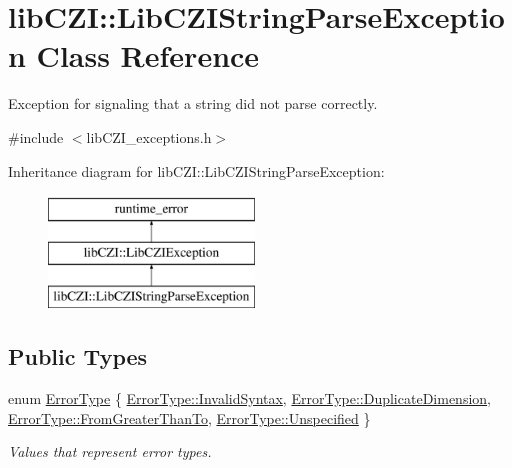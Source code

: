\hypertarget{classlib_c_z_i_1_1_lib_c_z_i_string_parse_exception}{}\section{lib\+C\+ZI\+:\+:Lib\+C\+Z\+I\+String\+Parse\+Exception Class Reference}
\label{classlib_c_z_i_1_1_lib_c_z_i_string_parse_exception}


Exception for signaling that a string did not parse correctly.  




{\ttfamily \#include $<$lib\+C\+Z\+I\+\_\+exceptions.\+h$>$}

Inheritance diagram for lib\+C\+ZI\+:\+:Lib\+C\+Z\+I\+String\+Parse\+Exception\+:\begin{figure}[H]
\begin{center}
\leavevmode
\includegraphics[height=3.000000cm]{classlib_c_z_i_1_1_lib_c_z_i_string_parse_exception}
\end{center}
\end{figure}
\subsection*{Public Types}
\begin{DoxyCompactItemize}
\item 
enum \hyperlink{classlib_c_z_i_1_1_lib_c_z_i_string_parse_exception_a42ecdd87f0e6f47ca0accda1b90497d2}{Error\+Type} \{ \hyperlink{classlib_c_z_i_1_1_lib_c_z_i_string_parse_exception_a42ecdd87f0e6f47ca0accda1b90497d2afc52000b95d50ca5da692212b69e61c2}{Error\+Type\+::\+Invalid\+Syntax}, 
\hyperlink{classlib_c_z_i_1_1_lib_c_z_i_string_parse_exception_a42ecdd87f0e6f47ca0accda1b90497d2a6a381f451ea053e25a0e87136e35dd19}{Error\+Type\+::\+Duplicate\+Dimension}, 
\hyperlink{classlib_c_z_i_1_1_lib_c_z_i_string_parse_exception_a42ecdd87f0e6f47ca0accda1b90497d2aff73eb7f68565f16f023d1c074816ea5}{Error\+Type\+::\+From\+Greater\+Than\+To}, 
\hyperlink{classlib_c_z_i_1_1_lib_c_z_i_string_parse_exception_a42ecdd87f0e6f47ca0accda1b90497d2a6fcdc090caeade09d0efd6253932b6f5}{Error\+Type\+::\+Unspecified}
 \}\begin{DoxyCompactList}\small\item\em Values that represent error types. \end{DoxyCompactList}
\end{DoxyCompactItemize}
